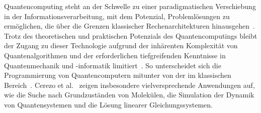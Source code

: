 
Quantencomputing steht an der Schwelle zu einer paradigmatischen
Verschiebung in der Informationsverarbeitung, mit dem Potenzial,
Problemlösungen zu ermöglichen, die über die Grenzen klassischer
Rechenarchitekturen hinausgehen~\cite{Shor1999}. Trotz des theoretischen und
praktischen Potenzials des Quantencomputings bleibt der Zugang zu dieser
Technologie aufgrund der inhärenten Komplexität von Quantenalgorithmen
und der erforderlichen tiefgreifenden Kenntnisse in Quantenmechanik und
-informatik limitiert~\cite{Chitransh2022}. So unterscheidet sich die Programmierung
von Quantencomputern mitunter von der im klassischen Bereich~\cite{Rieffel2011}. 
Cerezo et al.~\cite{Cerezo2021} zeigen insbesondere vielversprechende Anwendungen auf, wie die Suche nach
Grundzuständen von Molekülen, die Simulation der Dynamik von
Quantensystemen und die Lösung linearer Gleichungssystemen. 

